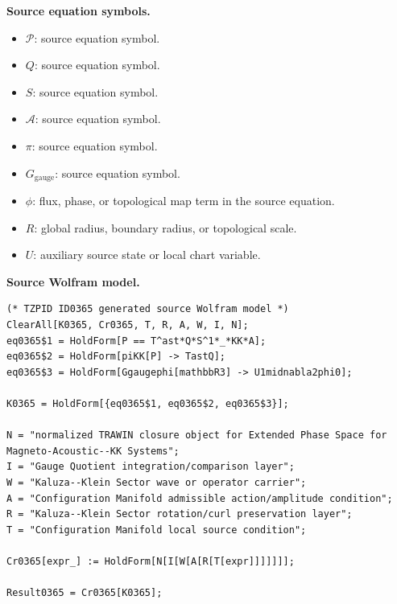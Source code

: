 \begin{minipage}[t]{0.49\linewidth}
\begingroup
\small
\raggedright
\textbf{Source equation symbols.}\par
\begin{itemize}[leftmargin=1.35em,itemsep=1pt,topsep=1pt,parsep=0pt]
    \item $\mathcal{P}$: source equation symbol.
    \item $Q$: source equation symbol.
    \item $S$: source equation symbol.
    \item $\mathcal{A}$: source equation symbol.
    \item $\pi$: source equation symbol.
    \item $G_{\mathrm{gauge}}$: source equation symbol.
    \item $\phi$: flux, phase, or topological map term in the source equation.
    \item $R$: global radius, boundary radius, or topological scale.
    \item $U$: auxiliary source state or local chart variable.
\end{itemize}
\endgroup
\end{minipage}\hfill
\begin{minipage}[t]{0.47\linewidth}
\begingroup
\scriptsize
\raggedright
\textbf{Source Wolfram model.}\par
\begin{Verbatim}[fontsize=\tiny,breaklines=true,breakanywhere=true]
(* TZPID ID0365 generated source Wolfram model *)
ClearAll[K0365, Cr0365, T, R, A, W, I, N];
eq0365$1 = HoldForm[P == T^ast*Q*S^1*_*KK*A];
eq0365$2 = HoldForm[piKK[P] -> TastQ];
eq0365$3 = HoldForm[Ggaugephi[mathbbR3] -> U1midnabla2phi0];

K0365 = HoldForm[{eq0365$1, eq0365$2, eq0365$3}];

N = "normalized TRAWIN closure object for Extended Phase Space for Magneto-Acoustic--KK Systems";
I = "Gauge Quotient integration/comparison layer";
W = "Kaluza--Klein Sector wave or operator carrier";
A = "Configuration Manifold admissible action/amplitude condition";
R = "Kaluza--Klein Sector rotation/curl preservation layer";
T = "Configuration Manifold local source condition";

Cr0365[expr_] := HoldForm[N[I[W[A[R[T[expr]]]]]]];

Result0365 = Cr0365[K0365];
\end{Verbatim}
\endgroup
\end{minipage}

